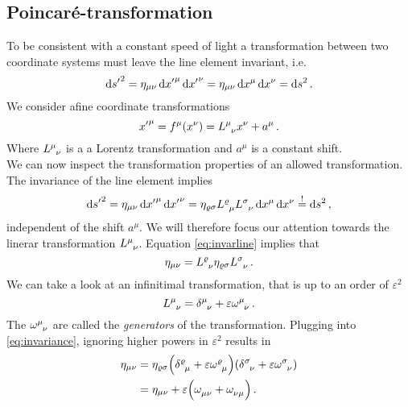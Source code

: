 \subsection{Poincaré-transformation}
To be consistent with a constant speed of light a transformation between two
coordinate systems must leave the line element invariant, i.e.
\begin{equation}
    \dif {s^\prime}^2 = \eta_{\mu\nu}\dif {x^\prime}^\mu\dif
    {x^\prime}^\nu=\eta_{\mu\nu}\dif x^\mu\dif
    x^\nu = \dif s^2\,. \label{eq:invarline}
\end{equation}
We consider afine coordinate transformations
\begin{equation}
    {x^\prime}^\mu= f^\mu(x^\nu)=\tensor{L}{^\mu_\nu}x^\nu+a^\mu\, .
\end{equation}
Where $\tensor{L}{^\mu_\nu}$ is a a Lorentz transformation and $a^\mu$ is a
constant shift.\\
We can now inspect the transformation properties of an allowed transformation.
The invariance of the line element implies
\begin{equation}
    \dif {s^\prime}^2 = \eta_{\mu\nu}\dif {x^\prime}^\mu\dif
    {x^\prime}^\nu=\eta_{\varrho\sigma}\tensor{L}{^\varrho_\mu}\tensor{L}{^\sigma_\nu}\dif
    x^\mu\dif x^\nu \stackrel{!}{=} \dif s^2\,,
\end{equation}
independent of the shift $a^\mu$. We will therefore focus our attention towards
the linerar transformation $\tensor{L}{^\mu_\nu}$. Equation
\eqref{eq:invarline} implies that
\begin{equation}
    \eta_{\mu\nu}=\tensor{L}{^\varrho_\nu}\eta_{\varrho\sigma}\tensor{L}{^\sigma_\nu}\,.\label{eq:invariance}
\end{equation}
We can take a look at an infinitimal transformation, that is up to an order of
$\varepsilon^2$
\begin{equation}
    \tensor{L}{^\mu_\nu}=\tensor{\delta}{^\mu_\nu}
    +\varepsilon\tensor{\omega}{^\mu_\nu}\, .
\end{equation}
The $\tensor{\omega}{^\mu_\nu}$ are called the \emph{generators} of the
transformation. Plugging into \eqref{eq:invariance}, ignoring higher powers in
$\varepsilon^2$ results in
\begin{equation}
    \begin{split}
        \eta_{\mu\nu}&=\eta_{\varrho\sigma}\left(\tensor{\delta}{^\varrho_\mu}
        +\varepsilon\tensor{\omega}{^\varrho_\mu}\right)\left(\tensor{\delta}{^\sigma_\nu}
        +\varepsilon\tensor{\omega}{^\sigma_\nu}\right)\\
        &=
        \eta_{\mu\nu}+\varepsilon\left(\tensor{\omega}{_\mu_\nu}+\tensor{\omega}{_\nu_\mu}\right)\,
        .
    \end{split}
\end{equation}
